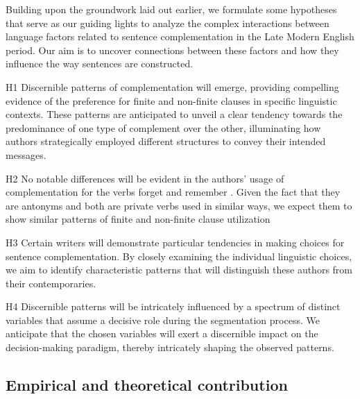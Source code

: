 \documentclass[final]{clv3} %
\begin{document}
Building upon the groundwork laid out earlier, we formulate some hypotheses that serve as our guiding lights to analyze the complex interactions between language factors related to sentence complementation in the Late Modern English period. Our aim is to uncover connections between these factors and how they influence the way sentences are constructed. 
\begin{deflist}
\item[H1] Discernible patterns of complementation will emerge, providing compelling evidence of the preference for finite and non-finite clauses in specific linguistic contexts. These patterns are anticipated to unveil a clear tendency towards the predominance of one type of complement over the other, illuminating how authors strategically employed different structures to convey their intended messages.

\item[H2] No notable differences will be evident in the authors’ usage of complementation for the verbs forget and remember . Given the fact that they are antonyms and both  are private verbs used in similar ways, we expect them to show similar patterns of finite and non-finite clause utilization 

\item[H3] Certain writers will demonstrate particular tendencies in making choices for sentence complementation. By closely examining the individual linguistic choices, we aim to identify characteristic patterns that will distinguish these authors from their contemporaries.

\item[H4] Discernible patterns will be intricately influenced by a spectrum of distinct variables that assume a decisive role during the segmentation process. We anticipate that the chosen variables will exert a discernible impact on the decision-making paradigm, thereby intricately shaping the observed patterns.

\end{deflist}
\subsection{Empirical and theoretical contribution}
\end{document}
